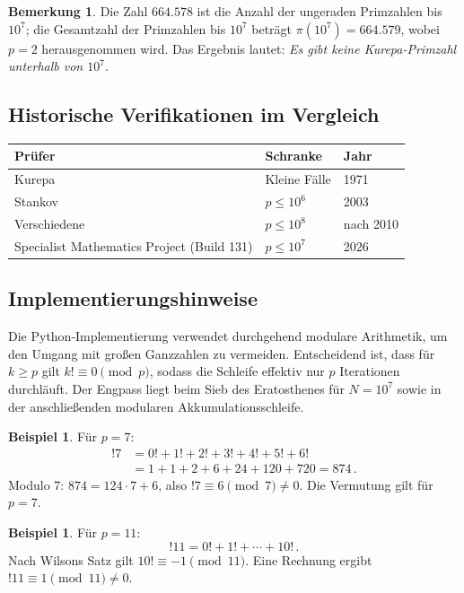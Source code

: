 \documentclass[12pt,a4paper]{amsart}
\theoremstyle{definition}
\newtheorem{beispiel}[theorem]{Beispiel}
\newtheorem{bemerkung}[theorem]{Bemerkung}
\begin{document}
\begin{bemerkung}
Die Zahl $664{.}578$ ist die Anzahl der ungeraden Primzahlen bis $10^7$;
die Gesamtzahl der Primzahlen bis $10^7$ beträgt $\pi(10^7) = 664{.}579$,
wobei $p = 2$ herausgenommen wird.
Das Ergebnis lautet: \emph{Es gibt keine Kurepa-Primzahl unterhalb von $10^7$}.
\end{bemerkung}

\subsection{Historische Verifikationen im Vergleich}

\begin{center}
\begin{tabular}{@{}lll@{}}
\toprule
Prüfer & Schranke & Jahr \\
\midrule
Kurepa & Kleine Fälle & 1971 \\
Stankov & $p \leq 10^6$ & 2003 \\
Verschiedene & $p \leq 10^8$ & nach 2010 \\
Specialist Mathematics Project (Build 131) & $p \leq 10^7$ & 2026 \\
\bottomrule
\end{tabular}
\end{center}

\subsection{Implementierungshinweise}

Die Python-Implementierung verwendet durchgehend modulare Arithmetik,
um den Umgang mit großen Ganzzahlen zu vermeiden.
Entscheidend ist, dass für $k \geq p$ gilt $k! \equiv 0 \pmod p$,
sodass die Schleife effektiv nur $p$ Iterationen durchläuft.
Der Engpass liegt beim Sieb des Eratosthenes für $N = 10^7$ sowie in der
anschließenden modularen Akkumulationsschleife.

\begin{beispiel}
Für $p = 7$:
\begin{align*}
  !7 &= 0! + 1! + 2! + 3! + 4! + 5! + 6!\\
     &= 1 + 1 + 2 + 6 + 24 + 120 + 720 = 874\,.
\end{align*}
Modulo 7: $874 = 124 \cdot 7 + 6$, also $!7 \equiv 6 \pmod 7 \neq 0$.
Die Vermutung gilt für $p = 7$.
\end{beispiel}

\begin{beispiel}
Für $p = 11$:
\[
  !11 = 0! + 1! + \cdots + 10!\,.
\]
Nach Wilsons Satz gilt $10! \equiv -1 \pmod{11}$.
Eine Rechnung ergibt $!11 \equiv 1 \pmod{11} \neq 0$.
\end{beispiel}
\end{document}

